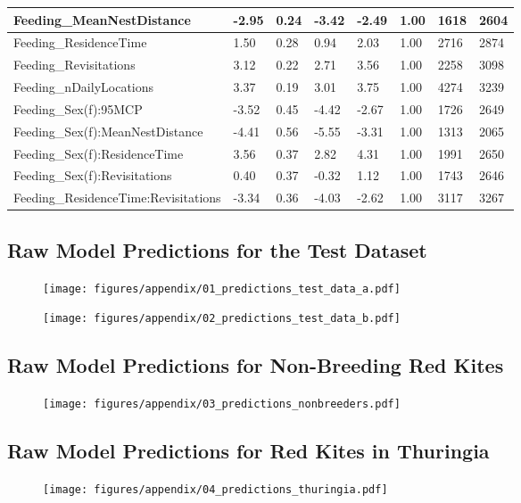 \begin{table}[H]
{\begin{center}
\begin{tabular}{| p{5.3cm} | p{1.1cm} | p{1.1cm} | p{0.85cm} | p{0.95cm} | p{0.5cm} | p{1.3cm} | p{1.2cm} |}
\hline
\footnotesize{Feeding\_MeanNestDistance} & -2.95 & 0.24 & -3.42 & -2.49 & 1.00 & 1618 & 2604 \\ 
\hline
\footnotesize{Feeding\_ResidenceTime} & 1.50 & 0.28 & 0.94 & 2.03 & 1.00 & 2716 & 2874 \\ 
\hline
\footnotesize{Feeding\_Revisitations} & 3.12 & 0.22 & 2.71 & 3.56 & 1.00 & 2258 & 3098 \\ 
\hline
\footnotesize{Feeding\_nDailyLocations} & 3.37 & 0.19 & 3.01 & 3.75 & 1.00 & 4274 & 3239 \\ 
\hline
\footnotesize{Feeding\_Sex(f):95MCP} & -3.52 & 0.45 & -4.42 & -2.67 & 1.00 & 1726 & 2649 \\ 
\hline
\footnotesize{Feeding\_Sex(f):MeanNestDistance} & -4.41 & 0.56 & -5.55 & -3.31 & 1.00 & 1313 & 2065 \\ 
\hline
\footnotesize{Feeding\_Sex(f):ResidenceTime} & 3.56 & 0.37 & 2.82 & 4.31 & 1.00 & 1991 & 2650 \\ 
\hline
\footnotesize{Feeding\_Sex(f):Revisitations} & 0.40 & 0.37 & -0.32 & 1.12 & 1.00 & 1743 & 2646 \\ 
\hline
\footnotesize{Feeding\_ResidenceTime:Revisitations} & -3.34 & 0.36 & -4.03 & -2.62 & 1.00 & 3117 & 3267 \\ 
\hline
\end{tabular}
\end{center}
}
\end{table}



\newpage
\subsection{Raw Model Predictions for the Test Dataset} \label{appendix:mlrm_predictions_test}
\begin{figure}[H]
\centering
\texttt{[image: figures/appendix/01\_predictions\_test\_data\_a.pdf]}
\end{figure}
\newpage
\begin{figure}[H]
\centering
\texttt{[image: figures/appendix/02\_predictions\_test\_data\_b.pdf]}
\end{figure}



\newpage
\subsection{Raw Model Predictions for Non-Breeding Red Kites} \label{appendix:mlrm_predictions_nonbreeding}
\begin{figure}[H]
\centering
\texttt{[image: figures/appendix/03\_predictions\_nonbreeders.pdf]}
\end{figure}



\newpage
\subsection{Raw Model Predictions for Red Kites in Thuringia} \label{appendix:mlrm_predictions_thuringia}
\begin{figure}[H]
\centering
\texttt{[image: figures/appendix/04\_predictions\_thuringia.pdf]}
\end{figure}
